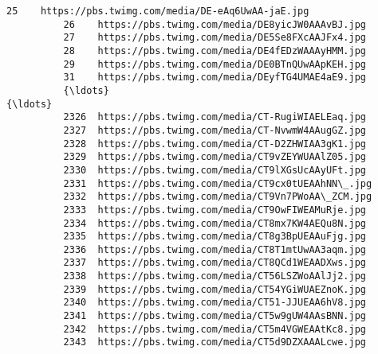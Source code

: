 \documentclass[11pt]{article}
\begin{document}
\begin{Verbatim}[commandchars=\\\{\}]
          25    https://pbs.twimg.com/media/DE-eAq6UwAA-jaE.jpg                                           
          26    https://pbs.twimg.com/media/DE8yicJW0AAAvBJ.jpg                                           
          27    https://pbs.twimg.com/media/DE5Se8FXcAAJFx4.jpg                                           
          28    https://pbs.twimg.com/media/DE4fEDzWAAAyHMM.jpg                                           
          29    https://pbs.twimg.com/media/DE0BTnQUwAApKEH.jpg                                           
          31    https://pbs.twimg.com/media/DEyfTG4UMAE4aE9.jpg                                           
          {\ldots}                                               {\ldots}                                           
          2326  https://pbs.twimg.com/media/CT-RugiWIAELEaq.jpg                                           
          2327  https://pbs.twimg.com/media/CT-NvwmW4AAugGZ.jpg                                           
          2328  https://pbs.twimg.com/media/CT-D2ZHWIAA3gK1.jpg                                           
          2329  https://pbs.twimg.com/media/CT9vZEYWUAAlZ05.jpg                                           
          2330  https://pbs.twimg.com/media/CT9lXGsUcAAyUFt.jpg                                           
          2331  https://pbs.twimg.com/media/CT9cx0tUEAAhNN\_.jpg                                           
          2332  https://pbs.twimg.com/media/CT9Vn7PWoAA\_ZCM.jpg                                           
          2333  https://pbs.twimg.com/media/CT9OwFIWEAMuRje.jpg                                           
          2334  https://pbs.twimg.com/media/CT8mx7KW4AEQu8N.jpg                                           
          2335  https://pbs.twimg.com/media/CT8g3BpUEAAuFjg.jpg                                           
          2336  https://pbs.twimg.com/media/CT8T1mtUwAA3aqm.jpg                                           
          2337  https://pbs.twimg.com/media/CT8QCd1WEAADXws.jpg                                           
          2338  https://pbs.twimg.com/media/CT56LSZWoAAlJj2.jpg                                           
          2339  https://pbs.twimg.com/media/CT54YGiWUAEZnoK.jpg                                           
          2340  https://pbs.twimg.com/media/CT51-JJUEAA6hV8.jpg                                           
          2341  https://pbs.twimg.com/media/CT5w9gUW4AAsBNN.jpg                                           
          2342  https://pbs.twimg.com/media/CT5m4VGWEAAtKc8.jpg                                           
          2343  https://pbs.twimg.com/media/CT5d9DZXAAALcwe.jpg                                           

\end{Verbatim}
\end{document}
